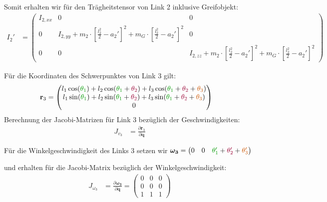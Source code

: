 \documentclass[a4paper, 12pt]{scrartcl}
\newcommand{\gruen}[2][gruen]{\textcolor{#1}{#2}}
\newcommand{\orange}[2][orange]{\textcolor{#1}{#2}}
\newcommand{\dunkelrot}[2][dunkelrot]{\textcolor{#1}{#2}}
\begin{document}
Somit erhalten wir für den Trägheitstensor von Link 2 inklusive Greifobjekt:
\begin{align*}
    I_{2}'
    &=
    \begin{pmatrix}
        I_{2,xx} & 0 & 0 \\
        0 & I_{2,yy} 
        + m_2 \cdot \left[\frac{l_2^2}{2} - a_{2}'\right]^2 
        + m_G \cdot \left[\frac{l_2^2}{2} - a_{2}'\right]^2 
        & 0 \\
        0 & 0 & I_{2,zz} 
        + m_2 \cdot \left[\frac{l_2^2}{2} - a_{2}'\right]^2 
        + m_G \cdot \left[\frac{l_2^2}{2} - a_{2}'\right]^2
    \end{pmatrix}
\end{align*}

Für die Koordinaten des Schwerpunktes von Link 3 gilt:
\begin{align*}
    \textbf{r}_3
    &=
    \begin{pmatrix}
        l_1 \cos(\gruen{\theta_1}) 
        + l_2 \cos(\gruen{\theta_1} + \dunkelrot{\theta_2}) 
        + l_3 \cos(\gruen{\theta_1} + \dunkelrot{\theta_2} + \orange{\theta_3}) \\
        l_1 \sin(\gruen{\theta_1}) 
        + l_2 \sin(\gruen{\theta_1} + \dunkelrot{\theta_2}) 
        + l_3 \sin(\gruen{\theta_1} + \dunkelrot{\theta_2} + \orange{\theta_3}) \\
        0
    \end{pmatrix}
\end{align*}
Berechnung der Jacobi-Matrizen für Link 3 bezüglich der Geschwindigkeiten:
\begin{align*}
    J_{v_3} &=
    \frac{\partial \textbf{r}_3}{\partial \textbf{q}}
\end{align*}

Für die Winkelgeschwindigkeit des Links 3 setzen wir 
$\bm{\omega_3}= 
\begin{pmatrix} 
    0 & 0 & \gruen{\theta_1'} + \dunkelrot{\theta_2'} + \orange{\theta_3'} 
\end{pmatrix}$

und erhalten für die Jacobi-Matrix bezüglich der Winkelgeschwindigkeit:
\begin{align*}
    J_{\omega_3} &=
    \frac{\partial \bm{\omega_3}}{\partial \dot{\textbf{q}}} 
    =
    \begin{pmatrix}
        0 & 0 & 0 \\
        0 & 0 & 0 \\
        1 & 1 & 1
    \end{pmatrix}
\end{align*}
\end{document}
